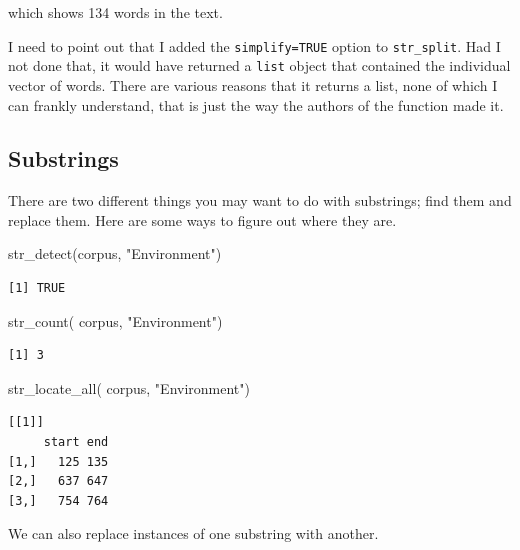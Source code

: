 \documentclass[
  letterpaper,
]{book}
\newenvironment{Shaded}{\begin{snugshade}}{\end{snugshade}}
\newcommand{\FunctionTok}[1]{\textcolor[rgb]{0.28,0.35,0.67}{#1}}
\newcommand{\NormalTok}[1]{\textcolor[rgb]{0.00,0.23,0.31}{#1}}
\newcommand{\StringTok}[1]{\textcolor[rgb]{0.13,0.47,0.30}{#1}}
\newcounter{none} %
\begin{document}
which shows 134 words in the text.

I need to point out that I added the \texttt{simplify=TRUE} option to
\texttt{str\_split}. Had I not done that, it would have returned a
\texttt{list} object that contained the individual vector of words.
There are various reasons that it returns a list, none of which I can
frankly understand, that is just the way the authors of the function
made it.

\subsection{Substrings}\label{substrings}

There are two different things you may want to do with substrings; find
them and replace them. Here are some ways to figure out where they are.

\begin{Shaded}
\begin{Highlighting}[]
\FunctionTok{str\_detect}\NormalTok{(corpus, }\StringTok{"Environment"}\NormalTok{)}
\end{Highlighting}
\end{Shaded}

\begin{verbatim}
[1] TRUE
\end{verbatim}

\begin{Shaded}
\begin{Highlighting}[]
\FunctionTok{str\_count}\NormalTok{( corpus, }\StringTok{"Environment"}\NormalTok{)}
\end{Highlighting}
\end{Shaded}

\begin{verbatim}
[1] 3
\end{verbatim}

\begin{Shaded}
\begin{Highlighting}[]
\FunctionTok{str\_locate\_all}\NormalTok{( corpus, }\StringTok{"Environment"}\NormalTok{)}
\end{Highlighting}
\end{Shaded}

\begin{verbatim}
[[1]]
     start end
[1,]   125 135
[2,]   637 647
[3,]   754 764
\end{verbatim}

We can also replace instances of one substring with another.
\end{document}
